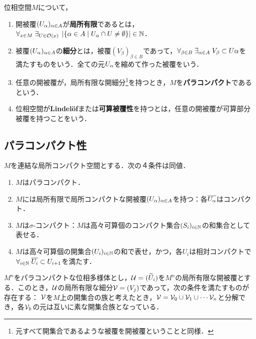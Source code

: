 \documentclass[uplatex,dvipdfmx]{jsreport}
\begin{document}
\begin{definition}
    位相空間$M$について，
    \begin{enumerate}
        \item 開被覆$(U_\alpha)_{\alpha\in A}$が\textbf{局所有限}であるとは，$\forall_{x\in M}\;\exists_{U\in\mathcal{O}(x)}\;\left|\left\{\alpha\in A\mid U_\alpha\cap U\ne\emptyset\right\}\right|\in\mathbb{N}$．
        \item 被覆$(U_\alpha)_{\alpha\in A}$の\textbf{細分}とは，被覆$(V_\beta)_{\beta\in B}$であって，$\forall_{\beta\in B}\;\exists_{\alpha\in A}\;V_\beta\subset U\alpha$を満たすものをいう．全ての元$U_\alpha$を縮めて作った被覆をいう．
        \item 任意の開被覆が，局所有限な開細分\footnote{元すべて開集合であるような被覆を開被覆ということと同様．}を持つとき，$M$を\textbf{パラコンパクト}であるという．
        \item 位相空間が\textbf{Lindelöf}または\textbf{可算被覆性}を持つとは，任意の開被覆が可算部分被覆を持つことをいう．
    \end{enumerate}
\end{definition}

\subsection{パラコンパクト性}

\begin{theorem}[局所コンパクト空間のパラコンパクト性の特徴付け]
    $M$を連結な局所コンパクト空間とする．次の４条件は同値．
    \begin{enumerate}
        \item $M$はパラコンパクト．
        \item $M$には局所有限で局所コンパクトな開被覆$(U_\alpha)_{\alpha\in A}$を持つ：各$\overline{U_\alpha}$はコンパクト．
        \item $M$は$\sigma$-コンパクト：$M$は高々可算個のコンパクト集合$(S_i)_{i\in\mathbb{N}}$の和集合として表せる．
        \item $M$は高々可算個の開集合$(U_i)_{i\in\mathbb{N}}$の和で表せ，かつ，各$U_i$は相対コンパクトで$\forall_{i\in\mathbb{N}}\;\overline{U_i}\subset U_{i+1}$を満たす．
    \end{enumerate}
\end{theorem}

\begin{theorem}[パラコンパクト多様体の開被覆]\label{thm-open-cover-of-paracompact-locally-Euclidean-space}
    $M^n$をパラコンパクトな位相多様体とし，$\mathcal{U}=(\widetilde{U}_i)$を$M^n$の局所有限な開被覆とする．このとき，$\mathcal{U}$の局所有限な細分$\mathcal{V}=(V_j)$であって，次の条件を満たすものが存在する：
    $\mathcal{V}$を$M$上の開集合の族と考えたとき，$\mathcal{V}=\mathcal{V}_0\cup\mathcal{V}_1\cup\cdots\mathcal{V}_n$と分解でき，各$\mathcal{V}_k$の元は互いに素な開集合族となっている．
\end{theorem}
\end{document}
